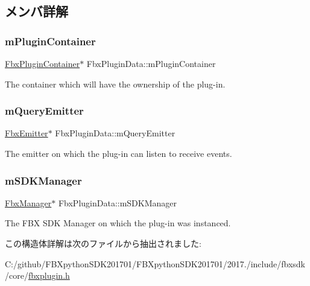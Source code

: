 \subsection{メンバ詳解}
\mbox{\label{struct_fbx_plugin_data_aa77748ca8ef7942f31b0c29aadc8d789}} 
\subsubsection{\texorpdfstring{m\+Plugin\+Container}{mPluginContainer}}
{\footnotesize\ttfamily \hyperlink{class_fbx_plugin_container}{Fbx\+Plugin\+Container}$\ast$ Fbx\+Plugin\+Data\+::m\+Plugin\+Container}



The container which will have the ownership of the plug-\/in. 

\mbox{\label{struct_fbx_plugin_data_a56d73d6518e4691e6f119b8362f1dff6}} 
\subsubsection{\texorpdfstring{m\+Query\+Emitter}{mQueryEmitter}}
{\footnotesize\ttfamily \hyperlink{class_fbx_emitter}{Fbx\+Emitter}$\ast$ Fbx\+Plugin\+Data\+::m\+Query\+Emitter}



The emitter on which the plug-\/in can listen to receive events. 

\mbox{\label{struct_fbx_plugin_data_abf03db73893382d5b5c7d46a3485f53d}} 
\subsubsection{\texorpdfstring{m\+S\+D\+K\+Manager}{mSDKManager}}
{\footnotesize\ttfamily \hyperlink{class_fbx_manager}{Fbx\+Manager}$\ast$ Fbx\+Plugin\+Data\+::m\+S\+D\+K\+Manager}



The F\+BX S\+DK Manager on which the plug-\/in was instanced. 



この構造体詳解は次のファイルから抽出されました\+:\begin{DoxyCompactItemize}
\item 
C\+:/github/\+F\+B\+Xpython\+S\+D\+K201701/\+F\+B\+Xpython\+S\+D\+K201701/2017./include/fbxsdk/core/\hyperlink{fbxplugin_8h}{fbxplugin.\+h}\end{DoxyCompactItemize}

